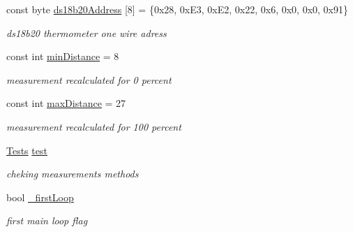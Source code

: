 \begin{DoxyCompactItemize}
\item 
\mbox{\label{class_measurement_ae3c69fa72e61999275f60e23b70de1db}} 
const byte \hyperlink{class_measurement_ae3c69fa72e61999275f60e23b70de1db}{ds18b20\+Address} \mbox{[}8\mbox{]} = \{0x28, 0x\+E3, 0x\+E2, 0x22, 0x6, 0x0, 0x0, 0x91\}
\begin{DoxyCompactList}\small\item\em ds18b20 thermometer one wire adress \end{DoxyCompactList}\item 
\mbox{\label{class_measurement_ae95e04f00212d0fc56a5a98c4eb40f92}} 
const int \hyperlink{class_measurement_ae95e04f00212d0fc56a5a98c4eb40f92}{min\+Distance} = 8
\begin{DoxyCompactList}\small\item\em measurement recalculated for 0 percent \end{DoxyCompactList}\item 
\mbox{\label{class_measurement_a2ef5d542938ad8beea632c0c7d2c4c81}} 
const int \hyperlink{class_measurement_a2ef5d542938ad8beea632c0c7d2c4c81}{max\+Distance} = 27
\begin{DoxyCompactList}\small\item\em measurement recalculated for 100 percent \end{DoxyCompactList}\item 
\mbox{\label{class_measurement_a69e7d5a4ae05fed0da4a88cda2205307}} 
\hyperlink{class_tests}{Tests} \hyperlink{class_measurement_a69e7d5a4ae05fed0da4a88cda2205307}{test}
\begin{DoxyCompactList}\small\item\em cheking measurements methods \end{DoxyCompactList}\item 
\mbox{\label{class_measurement_a2b1a2c2cad5ea9cfb2d041635f63d4e4}} 
bool \hyperlink{class_measurement_a2b1a2c2cad5ea9cfb2d041635f63d4e4}{\+\_\+first\+Loop}
\begin{DoxyCompactList}\small\item\em first main loop flag \end{DoxyCompactList}\end{DoxyCompactItemize}


